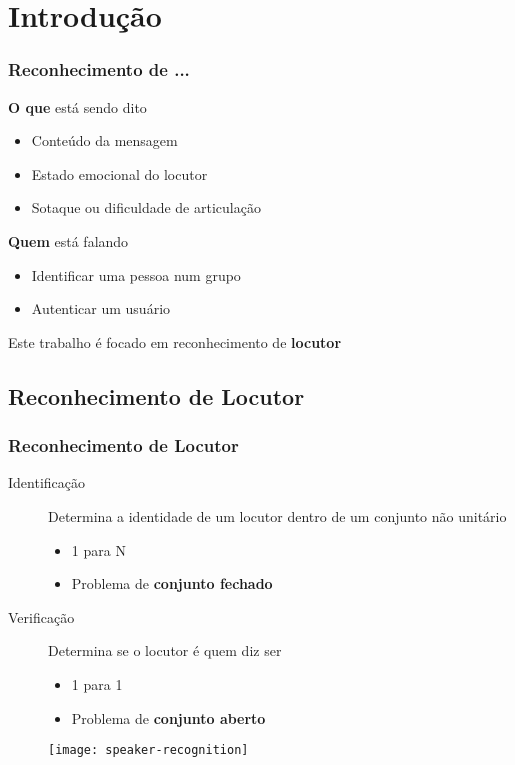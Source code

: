 \section{Introdução}
\label{sec:intro}

\contentscurrent

\begin{frame}
\frametitle{Reconhecimento de ...}
\begin{description}
    \item[Fala] \textbf{O que} está sendo dito
    \pause
    \begin{itemize}
        \item Conteúdo da mensagem
        \pause
        \item Estado emocional do locutor
        \pause
        \item Sotaque ou dificuldade de articulação
        \pause
    \end{itemize}
    \item[Locutor] \textbf{Quem} está falando
    \pause
    \begin{itemize}
        \item Identificar uma pessoa num grupo
        \pause
        \item Autenticar um usuário
        \pause
    \end{itemize}
    \item Este trabalho é focado em reconhecimento de \textbf{locutor}
\end{description}
\end{frame}

\subsection{Reconhecimento de Locutor}

\begin{frame}
\frametitle{Reconhecimento de Locutor}
\begin{description}
    \item[Identificação] Determina a identidade de um locutor dentro de um conjunto não unitário
    \pause
    \begin{itemize}
        \item 1 para N
        \pause
        \item Problema de \textbf{conjunto fechado}
        \pause
    \end{itemize}
    \item[Verificação] Determina se o locutor é quem diz ser
    \pause
    \begin{itemize}
        \item 1 para 1
        \pause
        \item Problema de \textbf{conjunto aberto}
        \pause
    \end{itemize}
\end{description}

\begin{figure}
    \centering
    \texttt{[image: speaker-recognition]}
\end{figure}
\end{frame}

